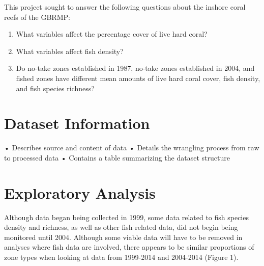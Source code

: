 \documentclass[12pt,]{article}
\providecommand{\tightlist}{%
  \setlength{\itemsep}{0pt}\setlength{\parskip}{0pt}}
\begin{document}
This project sought to answer the following questions about the inshore
coral reefs of the GBRMP:

\begin{enumerate}
\def\labelenumi{\arabic{enumi}.}
\tightlist
\item
  What variables affect the percentage cover of live hard coral?
\item
  What variables affect fish density?
\item
  Do no-take zones established in 1987, no-take zones established in
  2004, and fished zones have different mean amounts of live hard coral
  cover, fish density, and fish species richness?
\end{enumerate}

\newpage

\hypertarget{dataset-information}{%
\section{Dataset Information}\label{dataset-information}}

• Describes source and content of data • Details the wrangling process
from raw to processed data • Contains a table summarizing the dataset
structure

\newpage

\hypertarget{exploratory-analysis}{%
\section{Exploratory Analysis}\label{exploratory-analysis}}

Although data began being collected in 1999, some data related to fish
species density and richness, as well as other fish related data, did
not begin being monitored until 2004. Although some viable data will
have to be removed in analyses where fish data are involved, there
appears to be similar proportions of zone types when looking at data
from 1999-2014 and 2004-2014 (Figure 1).
\end{document}
